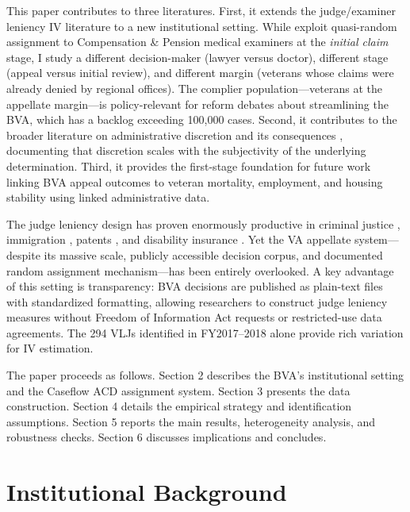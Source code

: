 \documentclass[12pt]{article}
\begin{document}
This paper contributes to three literatures. First, it extends the judge/examiner leniency IV literature to a new institutional setting. While \citet{silver2026} exploit quasi-random assignment to Compensation \& Pension medical examiners at the \textit{initial claim} stage, I study a different decision-maker (lawyer versus doctor), different stage (appeal versus initial review), and different margin (veterans whose claims were already denied by regional offices). The complier population---veterans at the appellate margin---is policy-relevant for reform debates about streamlining the BVA, which has a backlog exceeding 100,000 cases. Second, it contributes to the broader literature on administrative discretion and its consequences \citep{kleinberg2018,chen2016}, documenting that discretion scales with the subjectivity of the underlying determination. Third, it provides the first-stage foundation for future work linking BVA appeal outcomes to veteran mortality, employment, and housing stability using linked administrative data.

The judge leniency design has proven enormously productive in criminal justice \citep{dobbie2018,aizer2015,bhuller2020,garin2025,arnold2022}, immigration \citep{ramji2007}, patents \citep{galasso2015,sampat2019}, and disability insurance \citep{maestas2013,dahl2014,autor2019di}. Yet the VA appellate system---despite its massive scale, publicly accessible decision corpus, and documented random assignment mechanism---has been entirely overlooked. A key advantage of this setting is transparency: BVA decisions are published as plain-text files with standardized formatting, allowing researchers to construct judge leniency measures without Freedom of Information Act requests or restricted-use data agreements. The 294 VLJs identified in FY2017--2018 alone provide rich variation for IV estimation.

The paper proceeds as follows. Section 2 describes the BVA's institutional setting and the Caseflow ACD assignment system. Section 3 presents the data construction. Section 4 details the empirical strategy and identification assumptions. Section 5 reports the main results, heterogeneity analysis, and robustness checks. Section 6 discusses implications and concludes.


\section{Institutional Background}
\end{document}
